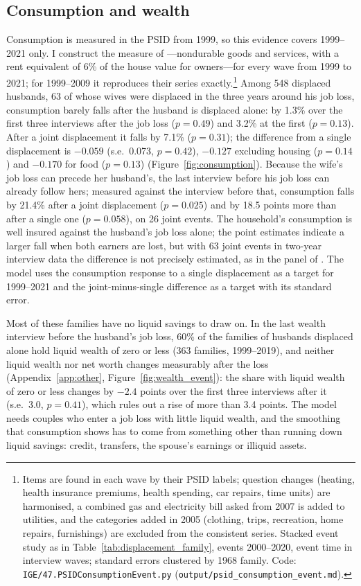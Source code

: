 \subsection{Consumption and wealth}

Consumption is measured in the PSID from 1999, so this evidence covers 1999--2021 only. I construct the measure of
\citet{blundell2016consumption}---nondurable goods and services, with a rent equivalent of 6\% of the house value for
owners---for every wave from 1999 to 2021; for 1999--2009 it reproduces their series exactly.\footnote{Items are found in
each wave by their PSID labels; question changes (heating, health insurance premiums, health spending, car repairs,
time units) are harmonised, a combined gas and electricity bill asked from 2007 is added to utilities, and the
categories added in 2005 (clothing, trips, recreation, home repairs, furnishings) are excluded from the consistent
series. Stacked event study as in Table~\ref{tab:displacement_family}, events 2000--2020, event time in interview waves;
standard errors clustered by 1968 family. Code: \texttt{IGE/47.PSIDConsumptionEvent.py}
(\texttt{output/psid\_consumption\_event.md}).} Among 548 displaced husbands, 63 of whose wives were displaced in the
three years around his job loss, consumption barely falls after the husband is displaced alone: by 1.3\% over the first
three interviews after the job loss ($p=0.49$) and 3.2\% at the first ($p=0.13$). After a joint displacement it falls by
7.1\% ($p=0.31$); the difference from a single displacement is $-0.059$ (s.e.\ 0.073, $p=0.42$), $-0.127$ excluding housing
($p=0.14$) and $-0.170$ for food ($p=0.13$) (Figure~\ref{fig:consumption}). Because the wife's job loss can precede her
husband's, the last interview before his job loss can already follow hers; measured against the interview before
that, consumption falls by 21.4\% after a joint displacement ($p=0.025$) and by 18.5 points more than after a single one
($p=0.058$), on 26 joint events. The household's consumption is well insured against the husband's job loss alone; the
point estimates indicate a larger fall when both earners are lost, but with 63 joint events in two-year interview data
the difference is not precisely estimated, as in the panel of \citet{blundell2016consumption}. The model uses the
consumption response to a single displacement as a target for 1999--2021 and the joint-minus-single difference as a
target with its standard error.

Most of these families have no liquid savings to draw on. In the last wealth interview before the husband's job loss,
60\% of the families of husbands displaced alone hold liquid wealth of zero or less (363 families, 1999--2019), and
neither liquid wealth nor net worth changes measurably after the loss (Appendix~\ref{app:other},
Figure~\ref{fig:wealth_event}): the share with liquid wealth of zero or less changes by $-2.4$ points over the first
three interviews after it (s.e.\ 3.0, $p=0.41$), which rules out a rise of more than 3.4 points. The model needs
couples who enter a job loss with little liquid wealth, and the smoothing that consumption shows has to come from
something other than running down liquid savings: credit, transfers, the spouse's earnings or illiquid assets.

